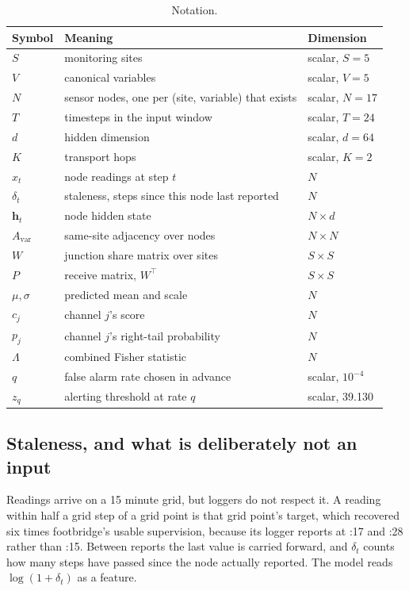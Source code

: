 \documentclass{article}
\begin{document}
\begin{table}[t]
  \centering
  \caption{Notation.}
  \label{tab:notation}
  \begin{tabular}{lll}
    \toprule
    Symbol & Meaning & Dimension \\
    \midrule
    $S$ & monitoring sites & scalar, $S = 5$ \\
    $V$ & canonical variables & scalar, $V = 5$ \\
    $N$ & sensor nodes, one per (site, variable) that exists & scalar, $N = 17$ \\
    $T$ & timesteps in the input window & scalar, $T = 24$ \\
    $d$ & hidden dimension & scalar, $d = 64$ \\
    $K$ & transport hops & scalar, $K = 2$ \\
    $x_{t}$ & node readings at step $t$ & $N$ \\
    $\delta_{t}$ & staleness, steps since this node last reported & $N$ \\
    $\bm{h}_{t}$ & node hidden state & $N \times d$ \\
    $A_{\mathrm{var}}$ & same-site adjacency over nodes & $N \times N$ \\
    $W$ & junction share matrix over sites & $S \times S$ \\
    $P$ & receive matrix, $W^{\top}$ & $S \times S$ \\
    $\mu, \sigma$ & predicted mean and scale & $N$ \\
    $c_{j}$ & channel $j$'s score & $N$ \\
    $p_{j}$ & channel $j$'s right-tail probability & $N$ \\
    $\Lambda$ & combined Fisher statistic & $N$ \\
    $q$ & false alarm rate chosen in advance & scalar, $10^{-4}$ \\
    $z_{q}$ & alerting threshold at rate $q$ & scalar, 39.130 \\
    \bottomrule
  \end{tabular}
\end{table}

\subsection{Staleness, and what is deliberately not an input}
\label{sec:staleness}

Readings arrive on a 15 minute grid, but loggers do not respect it. A reading
within half a grid step of a grid point is that grid point's target, which
recovered six times footbridge's usable supervision, because its logger reports
at :17 and :28 rather than :15. Between reports the last value is carried
forward, and $\delta_t$ counts how many steps have passed since the node
actually reported. The model reads $\log(1 + \delta_t)$ as a feature.
\end{document}
